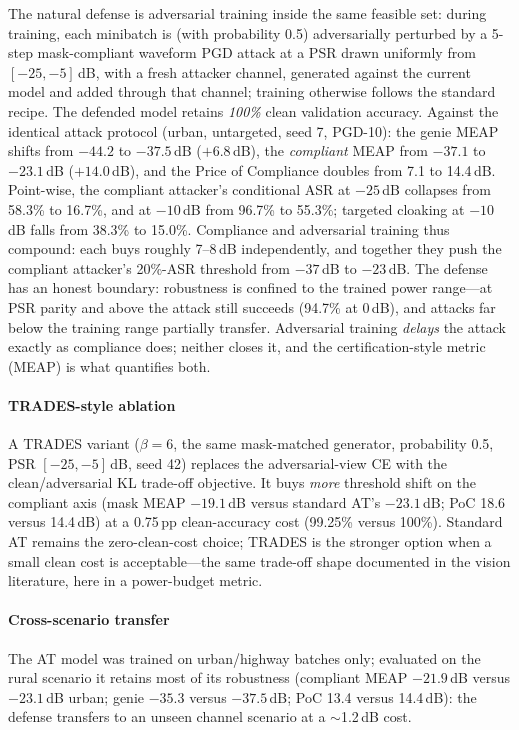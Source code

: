 \documentclass[review]{elsarticle}
\begin{document}
The natural defense is adversarial training inside the same feasible set:
during training, each minibatch is (with probability 0.5) adversarially
perturbed by a 5-step mask-compliant waveform PGD attack at a PSR drawn
uniformly from $[-25, -5]$\,dB, with a fresh attacker channel, generated
against the current model and added through that channel; training otherwise
follows the standard recipe. The defended model retains \emph{100\%} clean
validation accuracy. Against the identical attack protocol (urban,
untargeted, seed 7, PGD-10): the genie MEAP shifts from $-44.2$ to
$-37.5$\,dB ($+6.8$\,dB), the \emph{compliant} MEAP from $-37.1$ to
$-23.1$\,dB ($+14.0$\,dB), and the Price of Compliance doubles from 7.1 to
14.4\,dB. Point-wise, the compliant attacker's conditional ASR at $-25$\,dB
collapses from 58.3\% to 16.7\%, and at $-10$\,dB from 96.7\% to 55.3\%;
targeted cloaking at $-10$\,dB falls from 38.3\% to 15.0\%. Compliance and
adversarial training thus compound: each buys roughly 7--8\,dB
independently, and together they push the compliant attacker's
20\%-ASR threshold from $-37$\,dB to $-23$\,dB. The defense has an honest
boundary: robustness is confined to the trained power range---at PSR parity
and above the attack still succeeds (94.7\% at 0\,dB), and attacks far below
the training range partially transfer. Adversarial training \emph{delays} the
attack exactly as compliance does; neither closes it, and the
certification-style metric (MEAP) is what quantifies both.

\paragraph{TRADES-style ablation} A TRADES variant ($\beta = 6$, the same
mask-matched generator, probability 0.5, PSR $[-25,-5]$\,dB, seed 42)
replaces the adversarial-view CE with the clean/adversarial KL trade-off
objective. It buys \emph{more} threshold shift on the compliant axis
(mask MEAP $-19.1$\,dB versus standard AT's $-23.1$\,dB; PoC 18.6 versus
14.4\,dB) at a 0.75\,pp clean-accuracy cost (99.25\% versus 100\%).
Standard AT remains the zero-clean-cost choice; TRADES is the stronger
option when a small clean cost is acceptable---the same trade-off shape
documented in the vision literature, here in a power-budget metric.

\paragraph{Cross-scenario transfer} The AT model was trained on
urban/highway batches only; evaluated on the rural scenario it retains most
of its robustness (compliant MEAP $-21.9$\,dB versus $-23.1$\,dB urban;
genie $-35.3$ versus $-37.5$\,dB; PoC 13.4 versus 14.4\,dB): the defense
transfers to an unseen channel scenario at a ${\sim}$1.2\,dB cost.
\end{document}
